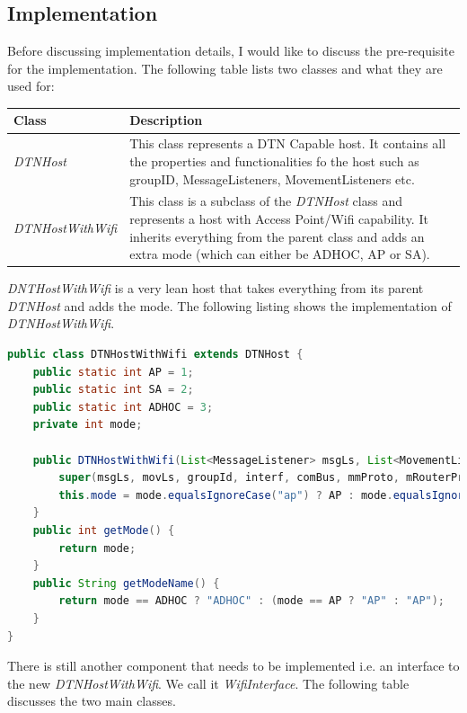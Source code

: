 \subsection{Implementation}
Before discussing implementation details, I would like to discuss the pre-requisite for the implementation. The following table lists two classes and what they are used for:
	\begin{center} 
	    \begin{tabular}{ | l | p{10.5cm} |}
    		\hline
    		\textbf{Class} & \textbf{Description} \\ \hline
    		\textit{DTNHost} & This class represents a DTN Capable host. It contains all the properties and functionalities fo the host such as groupID, MessageListeners, MovementListeners etc. \\ \hline
    		\textit{DTNHostWithWifi} & This class is a subclass of the \textit{DTNHost} class and represents a host with Access Point/Wifi capability. It inherits everything from the parent class and adds an extra mode (which can either be ADHOC, AP or SA). \\ \hline
    	\end{tabular}
	\end{center}
\vspace{3mm}
\textit{DNTHostWithWifi} is a very lean host that takes everything from its parent \textit{DTNHost} and adds the mode. The following listing shows the implementation of \textit{DTNHostWithWifi}.
\begin{lstlisting}[language=java]
public class DTNHostWithWifi extends DTNHost {
	public static int AP = 1;
	public static int SA = 2;
	public static int ADHOC = 3;
	private int mode;

	public DTNHostWithWifi(List<MessageListener> msgLs, List<MovementListener> movLs, String groupId,List<NetworkInterface> interf, ModuleCommunicationBus comBus, MovementModel mmProto, MessageRouter mRouterProto, String mode) {	
		super(msgLs, movLs, groupId, interf, comBus, mmProto, mRouterProto);	
		this.mode = mode.equalsIgnoreCase("ap") ? AP : mode.equalsIgnoreCase("sa") ? SA : ADHOC;
	}
	public int getMode() {
		return mode;
	}
	public String getModeName() {		
		return mode == ADHOC ? "ADHOC" : (mode == AP ? "AP" : "AP");
	}
}
\end{lstlisting}
\vspace{5mm}
There is still another component that needs to be implemented i.e. an interface to the new \textit{DTNHostWithWifi}. We call it \textit{WifiInterface}. The following table discusses the two main classes.

